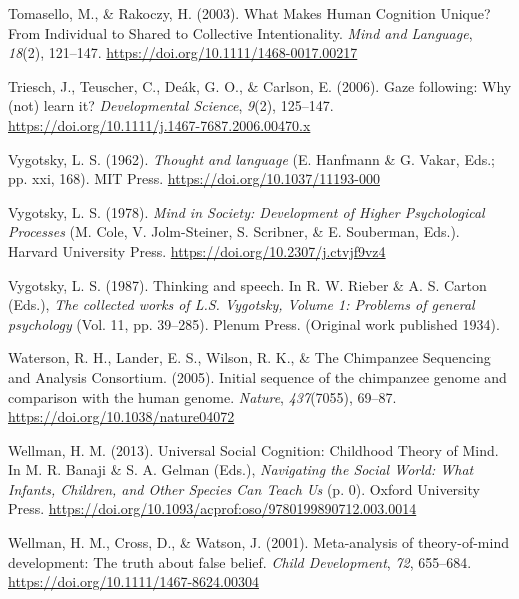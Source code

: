 \documentclass[
]{scrbook}
\newlength{\cslhangindent}
\newenvironment{CSLReferences}[2] %
 {\begin{list}{}{%
  \setlength{\itemindent}{0pt}
  \setlength{\leftmargin}{0pt}
  \setlength{\parsep}{0pt}
  \ifodd #1
   \setlength{\leftmargin}{\cslhangindent}
   \setlength{\itemindent}{-1\cslhangindent}
  \fi
  \setlength{\itemsep}{#2\baselineskip}}}
 {\end{list}}
\begin{document}
\begin{CSLReferences}{1}{0}
Tomasello, M., \& Rakoczy, H. (2003). What {Makes Human Cognition Unique}? {From Individual} to {Shared} to {Collective Intentionality}. \emph{Mind and Language}, \emph{18}(2), 121--147. \url{https://doi.org/10.1111/1468-0017.00217}

Triesch, J., Teuscher, C., Deák, G. O., \& Carlson, E. (2006). Gaze following: Why (not) learn it? \emph{Developmental Science}, \emph{9}(2), 125--147. \url{https://doi.org/10.1111/j.1467-7687.2006.00470.x}

Vygotsky, L. S. (1962). \emph{Thought and language} (E. Hanfmann \& G. Vakar, Eds.; pp. xxi, 168). MIT Press. \url{https://doi.org/10.1037/11193-000}

Vygotsky, L. S. (1978). \emph{Mind in {Society}: {Development} of {Higher Psychological Processes}} (M. Cole, V. Jolm-Steiner, S. Scribner, \& E. Souberman, Eds.). Harvard University Press. \url{https://doi.org/10.2307/j.ctvjf9vz4}

Vygotsky, L. S. (1987). Thinking and speech. In R. W. Rieber \& A. S. Carton (Eds.), \emph{The collected works of {L}.{S}. {Vygotsky}, {Volume} 1: {Problems} of general psychology} (Vol. 11, pp. 39--285). Plenum Press. (Original work published 1934).

Waterson, R. H., Lander, E. S., Wilson, R. K., \& The Chimpanzee Sequencing and Analysis Consortium. (2005). Initial sequence of the chimpanzee genome and comparison with the human genome. \emph{Nature}, \emph{437}(7055), 69--87. \url{https://doi.org/10.1038/nature04072}

Wellman, H. M. (2013). Universal {Social Cognition}: {Childhood Theory} of {Mind}. In M. R. Banaji \& S. A. Gelman (Eds.), \emph{Navigating the {Social World}: {What Infants}, {Children}, and {Other Species Can Teach Us}} (p. 0). Oxford University Press. \url{https://doi.org/10.1093/acprof:oso/9780199890712.003.0014}

Wellman, H. M., Cross, D., \& Watson, J. (2001). Meta-analysis of theory-of-mind development: {The} truth about false belief. \emph{Child Development}, \emph{72}, 655--684. \url{https://doi.org/10.1111/1467-8624.00304}


\end{CSLReferences}
\end{document}
